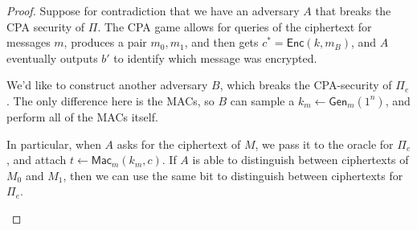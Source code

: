 \begin{proof}
    Suppose for contradiction that we have an adversary $A$ that breaks the CPA security of $\Pi$. The CPA game allows for queries of the ciphertext for messages $m$, produces a pair $m_0, m_1$, and then gets $c^* = \mathsf{Enc}(k, m_B)$, and $A$ eventually outputs $b'$ to identify which message was encrypted.

    We'd like to construct another adversary $B$, which breaks the CPA-security of $\Pi_e$. The only difference here is the MACs, so $B$ can sample a $k_m \gets \mathsf{Gen}_m(1^n)$, and perform all of the MACs itself.

    In particular, when $A$ asks for the ciphertext of $M$, we pass it to the oracle for $\Pi_e$, and attach $t \gets \mathsf{Mac}_m(k_m, c)$. If $A$ is able to distinguish between ciphertexts of $M_0$ and $M_1$, then we can use the same bit to distinguish between ciphertexts for $\Pi_e$.
    \begin{center}
    \end{center}


\end{proof}

